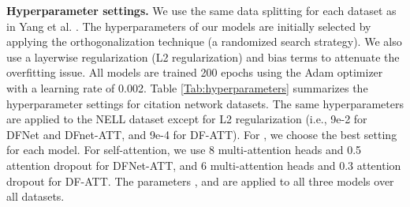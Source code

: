 \documentclass{article}
\begin{document}
\begin{table}[ht]
\centering {}
\caption{Hyperparameter settings for citation network datasets.\label{Tab:hyperparameters}}
\end{table}\vspace{-0.3cm}


\textbf{Hyperparameter settings.} We use the same data splitting for each dataset as in Yang et al. \cite{yang2016revisiting}. The hyperparameters of our models are initially selected by applying the orthogonalization technique (a randomized search strategy). We also use a layerwise regularization (L2 regularization) and bias terms to attenuate the overfitting issue. All models are trained 200 epochs using the Adam optimizer \cite{kingma2014adam} with a learning rate of 0.002. Table \ref{Tab:hyperparameters} summarizes the hyperparameter settings for citation network datasets.  The same hyperparameters are applied to the NELL dataset except for L2 regularization (i.e., 9e-2 for DFNet and DFnet-ATT, and 9e-4 for DF-ATT). For , we choose the best setting for each model. For self-attention, we use 8 multi-attention heads and 0.5 attention dropout for DFNet-ATT, and 6 multi-attention heads and 0.3 attention dropout for DF-ATT. The parameters ,  and  are applied to all three models over all datasets.
\end{document}

